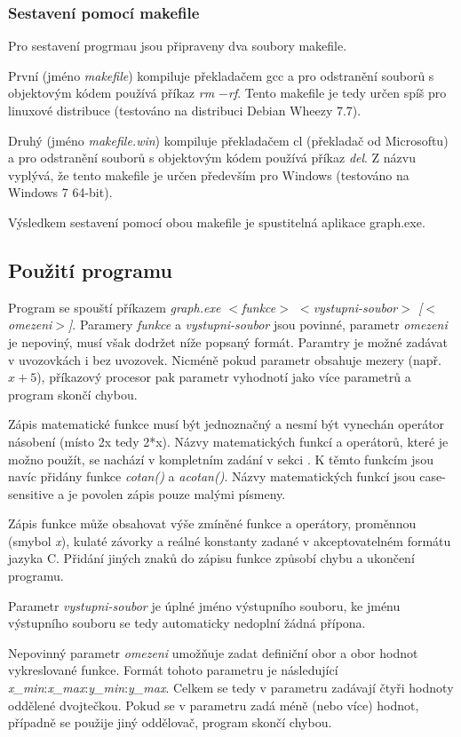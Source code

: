 \documentclass 	[a4paper,12pt]	{article}
\begin{document}
\subsubsection{Sestavení pomocí makefile}
Pro sestavení progrmau jsou připraveny dva soubory makefile.  

První (jméno \emph{makefile}) kompiluje překladačem gcc a pro odstranění souborů s objektovým kódem používá příkaz \emph{rm $-$rf}. Tento makefile je tedy určen spíš pro linuxové distribuce (testováno na distribuci Debian Wheezy 7.7).

Druhý (jméno \emph{makefile.win}) kompiluje překladačem cl (překladač od Microsoftu) a pro odstranění souborů s objektovým kódem používá příkaz \emph{del}. Z názvu vyplývá, že tento makefile je určen především pro Windows (testováno na Windows 7 64-bit). 

Výsledkem sestavení pomocí obou makefile je spustitelná aplikace graph.exe.

\subsection{Použití programu}
Program se spouští příkazem \emph{graph.exe $<$funkce$>$ $<$vystupni-soubor$>$ [$<$omezeni$>$]}. Paramery \emph{funkce} a \emph{vystupni-soubor} jsou povinné, parametr \emph{omezeni} je nepoviný, musí však dodržet níže popsaný formát. Paramtry je možné zadávat v uvozovkách i bez uvozovek. Nicméně pokud parametr obsahuje mezery (např. $x+5$), příkazový procesor pak parametr vyhodnotí jako více parametrů a program skončí chybou.

Zápis matematické funkce musí být jednoznačný a nesmí být vynechán operátor násobení (místo 2x tedy 2*x). Názvy matematických funkcí a operátorů, které je možno použít, se nachází v kompletním zadání v sekci . K těmto funkcím jsou navíc přidány funkce \emph{cotan()} a \emph{acotan()}. Názvy matematických funkcí jsou case-sensitive a je povolen zápis pouze malými písmeny. 

Zápis funkce může obsahovat výše zmíněné funkce a operátory, proměnnou (smybol \emph{x}), kulaté závorky a reálné konstanty zadané v akceptovatelném formátu jazyka C. Přidání jiných znaků do zápisu funkce způsobí chybu a ukončení programu.

Parametr \emph{vystupni-soubor} je úplné jméno výstupního souboru, ke jménu výstupního souboru se tedy automaticky nedoplní žádná přípona. 

Nepovinný parametr \emph{omezeni} umožňuje zadat definiční obor a obor hodnot vykreslované funkce. Formát tohoto parametru je následující \emph{x\_min}:\emph{x\_max}:\emph{y\_min}:\emph{y\_max}. Celkem se tedy v parametru zadávají čtyři hodnoty oddělené dvojtečkou. Pokud se v parametru zadá méně (nebo více) hodnot, případně se použije jiný oddělovač, program skončí chybou.
\end{document}
